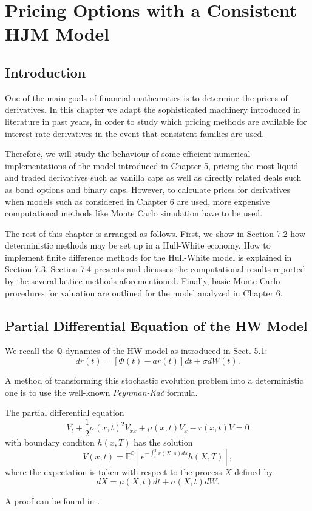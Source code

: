 \chapter{Pricing Options with a Consistent HJM Model}
\section{Introduction}
One of the main goals of financial mathematics is to determine the
prices of derivatives. In this chapter we adapt the sophisticated
machinery  introduced in literature in past years, in order to study
which pricing methods are available for interest rate derivatives in
the event that consistent families are used. 

Therefore, we will study the behaviour of some efficient numerical
implementations of the model introduced in Chapter 5, pricing the most
liquid and traded derivatives such as vanilla caps as well as
directly related deals such as bond options and binary caps. However,
to calculate prices for derivatives when models such as considered in
Chapter 6 are used, more expensive computational methods like Monte
Carlo simulation have to be used.

The rest of this chapter is arranged as follows. First, we show in
Section 7.2 how deterministic methods may be set up in a Hull-White
economy. How to implement finite difference methods for the Hull-White
model is explained in Section 7.3. Section 7.4 presents and dicusses the
computational results reported by the several lattice methods
aforementioned. Finally, basic Monte Carlo procedures for valuation
are outlined for the model analyzed in Chapter 6.

\section{Partial Differential Equation of the HW Model}
We recall the $\mathbb{Q}$-dynamics of the HW model as introduced in
Sect. 5.1: \begin{equation}
\label{HWNum}
dr(t)=\left[ \Phi(t)-a r(t)\right] dt + \sigma dW(t).
\end{equation}

A method of transforming this stochastic evolution problem into a
deterministic one is to use the well-known {\sl Feynman-Ka\v{c}} formula. 
\begin{tma}[Feynman-Ka\v c] The partial differential equation
$$
V_t + \frac{1}{2} \sigma(x,t)^2 V_{xx}+ \mu(x,t)V_x - r(x,t) V = 0
$$
with boundary conditon $h(x, T)$ has the solution
$$
V(x,t)= \mathbb{E}^\mathbb{Q} \left[ e^{-\int_t^T r(X, s) ds} h(X, T)\right],
$$
where the expectation is taken with respect to the process $X$ defined
by
$$
dX = \mu(X, t) dt+\sigma(X, t) dW.
$$
\end{tma}
\begin{demo}
A proof can be found in \cite{O:1998}. 
\end{demo}

